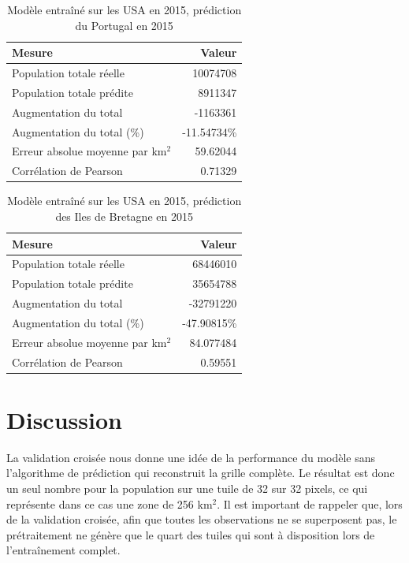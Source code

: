\documentclass[a4paper, 11pt]{report}
\begin{document}
\begin{table}
	\centering
	\caption{Modèle entraîné sur les USA en 2015, prédiction du Portugal en 2015}
	\begin{tabular}{ l r }
		\hline
		\textbf{Mesure} & \textbf{Valeur} \\
		\hline\hline
		Population totale réelle & 10074708 \\
		\hline
		Population totale prédite & 8911347 \\
		\hline
		Augmentation du total & -1163361 \\
		\hline
		Augmentation du total (\%) & -11.54734\% \\
		\hline
		Erreur absolue moyenne par km$^2$ & 59.62044 \\
		\hline
		Corrélation de Pearson & 0.71329 \\
		\hline
	\end{tabular}
	\label{stats-usa-portugal}
\end{table}

\begin{table}
	\centering
	\caption{Modèle entraîné sur les USA en 2015, prédiction des Iles de Bretagne en 2015}
	\begin{tabular}{ l r }
		\hline
		\textbf{Mesure} & \textbf{Valeur} \\
		\hline\hline
		Population totale réelle & 68446010 \\
		\hline
		Population totale prédite & 35654788 \\
		\hline
		Augmentation du total & -32791220 \\
		\hline
		Augmentation du total (\%) & -47.90815\% \\
		\hline
		Erreur absolue moyenne par km$^2$ & 84.077484 \\
		\hline
		Corrélation de Pearson & 0.59551 \\
		\hline
	\end{tabular}
	\label{stats-usa-britishislands}
\end{table}

\section{Discussion}
La validation croisée nous donne une idée de la performance du modèle sans l'algorithme de prédiction qui reconstruit la grille complète. Le résultat est donc un seul nombre pour la population sur une tuile de 32 sur 32 pixels, ce qui représente dans ce cas une zone de 256 km$^2$. Il est important de rappeler que, lors de la validation croisée, afin que toutes les observations ne se superposent pas, le prétraitement ne génère que le quart des tuiles qui sont à disposition lors de l'entraînement complet.
\end{document}
